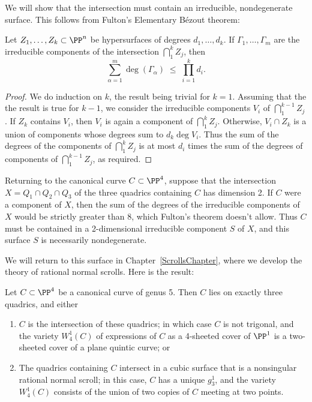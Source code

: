 We will show that the intersection must contain an irreducible, nondegenerate surface. This  follows from Fulton's Elementary B\'ezout  theorem:

\begin{theorem}\cite{Fulton}\label{Fulton Bezout}
Let $Z_1,\dots, Z_k \subset \PP^n$ be hypersurfaces of degrees $d_1,\dots,d_k$. If $\Gamma_1,\dots,\Gamma_m$ are the irreducible components of the intersection $\bigcap_1^kZ_j$, then
$$
\sum_{\alpha = 1}^m \deg(\Gamma_\alpha) \; \leq \; \prod_{i=1}^k d_i.
$$
\end{theorem}

\begin{proof}
We do induction on $k$, the result being trivial for $k=1$. Assuming that the the result
is true for $k-1$, we consider the irreducible components $V_i$ of $\bigcap_1^{k-1}Z_j$. If $Z_k$ contains
$V_i$, then $V_i$ is again a component of $\bigcap_1^kZ_j$. Otherwise,
$V_i\cap Z_k$ is a union of components whose degrees sum to $d_k\deg V_i$. Thus
the sum of the degrees of the components of $\bigcap_1^kZ_j$ is at most $d_i$ times the
sum of the degrees of components of $\bigcap_1^{k-1}Z_j$, as required.
\end{proof}

Returning to the canonical curve $C \subset \PP^4$, suppose that the intersection $X = Q_1 \cap Q_2 \cap Q_3$ of the three quadrics containing $C$ has dimension 2. If $C$ were a component of $X$, then the sum of the degrees of the irreducible components of $X$ would be strictly greater than 8, which Fulton's theorem doesn't allow. Thus $C$ must be contained in a 2-dimensional irreducible component  $S$ of $X$, and this surface $S$ is necessarily nondegenerate.

We will return to this surface in Chapter~\ref{ScrollsChapter}, where we develop the theory of rational normal scrolls.
Here is the result:

\begin{theorem}
Let $C \subset \PP^4$ be a canonical curve of genus 5. Then $C$ lies on exactly three quadrics, and either
\begin{enumerate}
\item $C$ is the intersection of these quadrics; in which case $C$ is not trigonal, and the variety $W^1_4(C)$ of expressions of $C$ as a 4-sheeted cover of $\PP^1$ is a two-sheeted cover of a plane quintic curve; or
\item The quadrics containing $C$ intersect in a cubic surface that is
a nonsingular rational normal scroll; in this case, $C$ has a unique $g^1_3$, and the variety $W^1_4(C)$ consists of the union of two copies of $C$ meeting at two points.
\end{enumerate}
\end{theorem}

